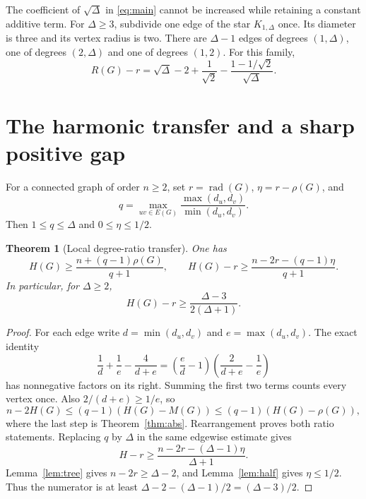 \documentclass[11pt,a4paper]{article}
\newtheorem{theorem}{Theorem}[section]
\newcommand{\rad}{\operatorname{rad}}
\begin{document}
The coefficient of $\sqrt{\Delta}$ in \eqref{eq:main} cannot be
increased while retaining a constant additive term. For $\Delta\ge3$,
subdivide one edge of the star $K_{1,\Delta}$ once. Its diameter is
three and its vertex radius is two. There are $\Delta-1$ edges of
degrees $(1,\Delta)$, one of degrees $(2,\Delta)$ and one of degrees
$(1,2)$. For this family,
\[
 R(G)-r=\sqrt{\Delta}-2+\frac1{\sqrt2}
            -\frac{1-1/\sqrt2}{\sqrt{\Delta}} .
\]


\section{The harmonic transfer and a sharp positive gap}\label{sec:harmonic}
For a connected graph of order $n\ge2$, set $r=\rad(G)$,
$\eta=r-\rho(G)$, and
\[
q=\max_{uv\in E(G)}\frac{\max(d_u,d_v)}{\min(d_u,d_v)}.
\]
Then $1\le q\le\Delta$ and $0\le\eta\le1/2$.

\begin{theorem}[Local degree-ratio transfer]\label{thm:harmonic-ratio}
One has
\[
H(G)\ge\frac{n+(q-1)\rho(G)}{q+1},\qquad
H(G)-r\ge\frac{n-2r-(q-1)\eta}{q+1}.
\]
In particular, for $\Delta\ge2$,
\begin{equation}\label{eq:harmonic-degree}
H(G)-r\ge\frac{\Delta-3}{2(\Delta+1)}.
\end{equation}
\end{theorem}
\begin{proof}
For each edge write $d=\min(d_u,d_v)$ and $e=\max(d_u,d_v)$.
The exact identity
\[
\frac1d+\frac1e-\frac4{d+e}
=\left(\frac ed-1\right)
 \left(\frac2{d+e}-\frac1e\right)
\]
has nonnegative factors on its right. Summing the first two terms
counts every vertex once. Also $2/(d+e)\ge1/e$, so
\[
n-2H(G)\le(q-1)(H(G)-M(G))
\le(q-1)(H(G)-\rho(G)),
\]
where the last step is Theorem~\ref{thm:abs}. Rearrangement proves
both ratio statements. Replacing $q$ by $\Delta$ in the same
edgewise estimate gives
\[
H-r\ge\frac{n-2r-(\Delta-1)\eta}{\Delta+1}.
\]
Lemma~\ref{lem:tree} gives $n-2r\ge\Delta-2$, and
Lemma~\ref{lem:half} gives $\eta\le1/2$. Thus the numerator is at
least $\Delta-2-(\Delta-1)/2=(\Delta-3)/2$.
\end{proof}
\end{document}
